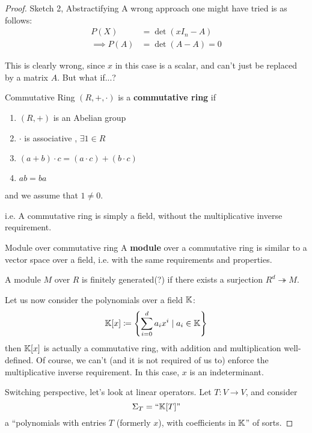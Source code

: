 \begin{proof} {Sketch 2, Abstractifying}
    A wrong approach one might have tried is as follows:
    \begin{align*}
        P(X)          & = \det(x I_n - A)  \\
        \implies P(A) & = \det (A - A) = 0
    \end{align*}

    This is clearly wrong, since \(x\) in this case is a scalar, and can't just be replaced by a matrix \(A\). But what if...?

    \begin{definition} {Commutative Ring}
        \((R, +, \cdot)\) is a \textbf{commutative ring} if \begin{enumerate}
            \item \((R, +)\) is an Abelian group
            \item \(\cdot\) is associative , \(\exists 1 \in R\)
            \item \((a+b) \cdot c = (a \cdot c) + (b \cdot c)\)
            \item \(ab = ba\)
        \end{enumerate}
        and we assume that \(1 \neq 0\).

        i.e. A commutative ring is simply a field, without the multiplicative inverse requirement.
    \end{definition}

    \begin{definition} {Module over commutative ring}
        A \textbf{module} over a commutative ring is similar to a vector space over a field, i.e. with the same requirements and properties.

        A module \(M\) over \(R\) is finitely generated(?) if there exists a surjection \(R^d \twoheadrightarrow M\).
    \end{definition}

    Let us now consider the polynomials over a field \(\mathbb{K}\):
    \[
        \mathbb{K}[x] \coloneqq \left\{\sum_{i=0}^{d}a_i x^i \mid a_i \in \mathbb{K}\right\}
    \]
    then \(\mathbb{K}[x] \) is actually a commutative ring, with addition and multiplication well-defined. Of course, we can't (and it is not required of us to) enforce the multiplicative inverse requirement. In this case, \(x\) is an indeterminant.

    Switching perspective, let's look at linear operators. Let \(T: V \to V\), and consider \[
        \Sigma_T = ``\mathbb{K}[T]"
    \]
    a ``polynomials with entries \(T\) (formerly \(x\)), with coefficients in \(\mathbb{K}\)'' of sorts.


\end{proof}
